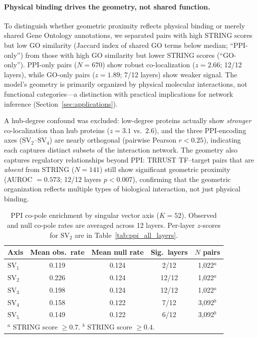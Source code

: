 \documentclass[12pt]{article}
\newcommand{\SV}[1]{\mathrm{SV}_{#1}}
\begin{document}
\paragraph{Physical binding drives the geometry, not shared function.}
To distinguish whether geometric proximity reflects physical binding or merely shared Gene Ontology annotations, we separated pairs with high STRING scores but low GO similarity (Jaccard index of shared GO terms below median; ``PPI-only'') from those with high GO similarity but lower STRING scores (``GO-only'').
PPI-only pairs ($N = 670$) show robust co-localization ($z = 2.66$; 12/12 layers), while GO-only pairs ($z = 1.89$; 7/12 layers) show weaker signal.
The model's geometry is primarily organized by physical molecular interactions, not functional categories---a distinction with practical implications for network inference (Section~\ref{sec:applications}).

A hub-degree confound was excluded: low-degree proteins actually show \emph{stronger} co-localization than hub proteins ($z = 3.1$ vs.\ $2.6$), and the three PPI-encoding axes ($\SV{2}$--$\SV{4}$) are nearly orthogonal (pairwise Pearson $r < 0.25$), indicating each captures distinct subsets of the interaction network.
The geometry also captures regulatory relationships beyond PPI: TRRUST TF--target pairs that are \emph{absent} from STRING ($N = 141$) still show significant geometric proximity (AUROC $= 0.573$; 12/12 layers $p < 0.007$), confirming that the geometric organization reflects multiple types of biological interaction, not just physical binding.

\begin{table}[!ht]
\centering
\caption{PPI co-pole enrichment by singular vector axis ($K = 52$). Observed and null co-pole rates are averaged across 12 layers. Per-layer $z$-scores for $\SV{2}$ are in Table~\ref{tab:ppi_all_layers}.}
\label{tab:ppi_axis}
\small
\begin{tabular}{lcccc}
\toprule
Axis & Mean obs.\ rate & Mean null rate & Sig.\ layers & $N$ pairs \\
\midrule
$\SV{1}$ & 0.119 & 0.124 & 2/12 & 1{,}022$^a$ \\
$\SV{2}$ & 0.226 & 0.124 & 12/12 & 1{,}022$^a$ \\
$\SV{3}$ & 0.198 & 0.124 & 12/12 & 1{,}022$^a$ \\
$\SV{4}$ & 0.158 & 0.122 & 7/12 & 3{,}092$^b$ \\
$\SV{5}$ & 0.149 & 0.122 & 6/12 & 3{,}092$^b$ \\
\bottomrule
\multicolumn{5}{l}{\footnotesize $^a$ STRING score $\geq 0.7$. \quad $^b$ STRING score $\geq 0.4$.}
\end{tabular}
\end{table}
\end{document}

